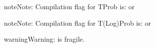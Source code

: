 \documentclass[letterpaper,10pt,openany,oneside,english]{sphinxmanual}
\begin{document}
\begin{sphinxadmonition}{note}{Note:}
\sphinxAtStartPar
Compilation flag for TProb is:  or  
\end{sphinxadmonition}

\begin{sphinxadmonition}{note}{Note:}
\sphinxAtStartPar
Compilation flag for T(Log)Prob is:  or  
\end{sphinxadmonition}

\begin{sphinxadmonition}{warning}{Warning:}
\sphinxAtStartPar
{} is fragile. 
\end{sphinxadmonition}
\end{document}
